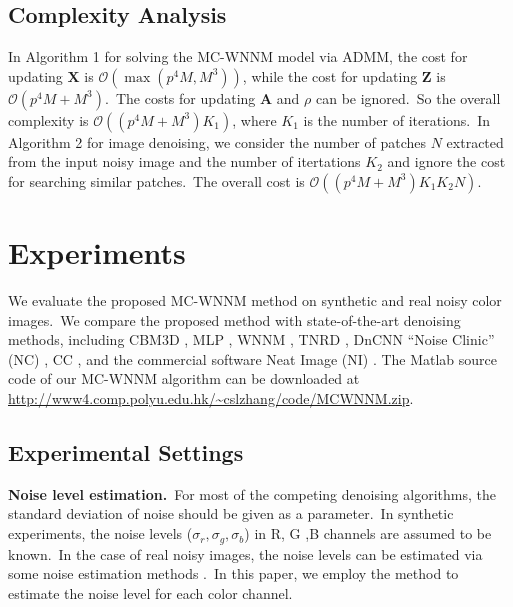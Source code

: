 \documentclass[10pt,twocolumn,letterpaper]{article}
\begin{document}
\vspace{-3mm}
\subsection{Complexity Analysis}
\vspace{-1mm}

In Algorithm 1 for solving the MC-WNNM model via ADMM, the cost for updating $\bm{X}$ is $\mathcal{O}(\max(p^{4}M, M^{3}))$, while the cost for updating $\bm{Z}$ is $\mathcal{O}(p^{4}M+M^{3})$.\ The costs for updating $\bm{A}$ and $\rho$ can be ignored.\ So the overall complexity is $\mathcal{O}((p^{4}M+M^{3})K_{1})$, where $K_{1}$ is the number of iterations.\ In Algorithm 2 for image denoising, we consider the number of patches $N$ extracted from the input noisy image and the number of itertations $K_{2}$ and ignore the cost for searching similar patches.\ The overall cost is $\mathcal{O}((p^{4}M+M^{3})K_{1}K_{2}N)$.

\vspace{-1mm}
\section{Experiments}
\vspace{-1mm}

We evaluate the proposed MC-WNNM method on synthetic and real noisy color images.\ We compare the proposed method with state-of-the-art denoising methods, including CBM3D \cite{cbm3d}, MLP \cite{mlp}, WNNM \cite{wnnm}, TNRD \cite{chen2015learning}, DnCNN \cite{dncnn} ``Noise Clinic'' (NC) \cite{noiseclinic,ncwebsite}, CC \cite{crosschannel2016}, and the commercial software Neat Image (NI) \cite{neatimage}. The Matlab source code of our MC-WNNM algorithm can be downloaded at \url{http://www4.comp.polyu.edu.hk/~cslzhang/code/MCWNNM.zip}.

\vspace{-1mm}
\subsection{Experimental Settings}
\vspace{-1mm}

\textbf{Noise level estimation.}\
For most of the competing denoising algorithms, the standard deviation of noise should be given as a parameter.\ In synthetic experiments, the noise levels ($\sigma_{r}, \sigma_{g}, \sigma_{b}$) in R, G ,B channels are assumed to be known.\ In the case of real noisy images, the noise levels can be estimated via some noise estimation methods \cite{noiselevel,Chen2015ICCV}.\ In this paper, we employ the method \cite{Chen2015ICCV} to estimate the noise level for each color channel. 
\end{document}
